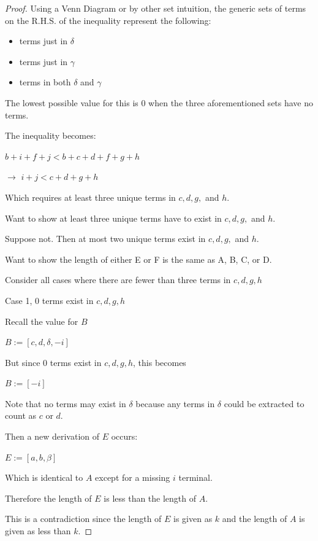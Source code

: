 \documentclass[manuscript]{acmart}
\begin{document}
\begin{proof}
        Using a Venn Diagram or by other set intuition, the generic sets of 
        terms on the R.H.S. of the inequality represent the following:

        \begin{itemize}
            \item terms just in $\delta$
            \item terms just in $\gamma$
            \item terms in both $\delta$ and $\gamma$
        \end{itemize}
        
        The lowest possible value for this is 0 when the three aforementioned sets
        have no terms.

        The inequality becomes:

        $b + i + f + j < b + c + d + f + g + h$

        $\rightarrow$ $i + j < c + d + g + h$

        Which requires at least three unique terms in $c, d, g,$ and $h$.

        Want to show at least three unique terms have to exist in 
        $c, d, g,$ and $h$.

        Suppose not. Then at most two unique terms exist in $c, d, g,$ and $h$.

        Want to show the length of either E or F is the same as A, B, C, or D.

        Consider all cases where there are fewer than three terms in {$c, d, g, h$}

        Case 1, 0 terms exist in {$c, d, g, h$}

        Recall the value for $B$

        $B := [c, d, \delta, -i]$

        But since 0 terms exist in {$c, d, g, h$}, this becomes

        $B := [-i]$

        Note that no terms may exist in $\delta$ because any terms
        in $\delta$ could be extracted to count as $c$ or $d$.

        Then a new derivation of $E$ occurs:

        $E := [a, b, \beta]$

        Which is identical to $A$ except for a missing $i$ terminal.

        Therefore the length of $E$ is less than the length of $A$.

        This is a contradiction since the length of $E$ is given as $k$
        and the length of $A$ is given as less than $k$.


\end{proof}
\end{document}
